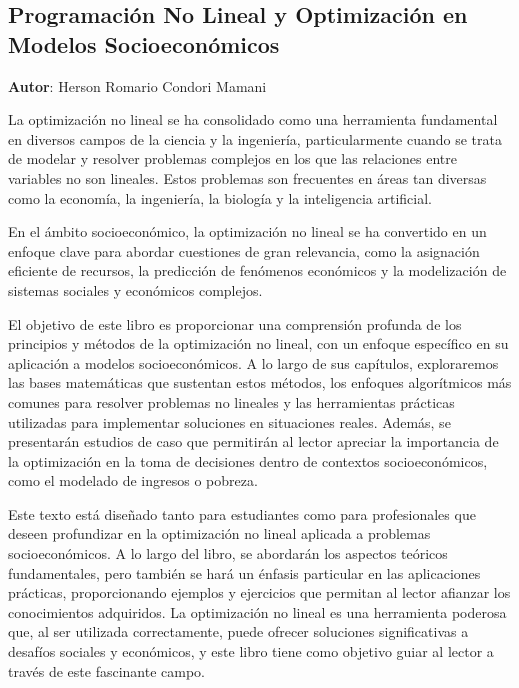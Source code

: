 
\begin{flushleft}
		
	\chapter{Programación No Lineal y Optimización en Modelos Socioeconómicos}
	\textbf{Autor}: \large{Herson Romario Condori Mamani}
	\label{chap:6}
	
	\vspace{1em}
	La optimización no lineal se ha consolidado como una herramienta fundamental en diversos campos de la ciencia y la ingeniería, particularmente cuando se trata de modelar y resolver problemas complejos en los que las relaciones entre variables no son lineales. Estos problemas son frecuentes en áreas tan diversas como la economía, la ingeniería, la biología y la inteligencia artificial.
	
	En el ámbito socioeconómico, la optimización no lineal se ha convertido en un enfoque clave para abordar cuestiones de gran relevancia, como la asignación eficiente de recursos, la predicción de fenómenos económicos y la modelización de sistemas sociales y económicos complejos.
	
	El objetivo de este libro es proporcionar una comprensión profunda de los principios y métodos de la optimización no lineal, con un enfoque específico en su aplicación a modelos socioeconómicos. A lo largo de sus capítulos, exploraremos las bases matemáticas que sustentan estos métodos, los enfoques algorítmicos más comunes para resolver problemas no lineales y las herramientas prácticas utilizadas para implementar soluciones en situaciones reales. Además, se presentarán estudios de caso que permitirán al lector apreciar la importancia de la optimización en la toma de decisiones dentro de contextos socioeconómicos, como el modelado de ingresos o pobreza.
	
	Este texto está diseñado tanto para estudiantes como para profesionales que deseen profundizar en la optimización no lineal aplicada a problemas socioeconómicos. A lo largo del libro, se abordarán los aspectos teóricos fundamentales, pero también se hará un énfasis particular en las aplicaciones prácticas, proporcionando ejemplos y ejercicios que permitan al lector afianzar los conocimientos adquiridos. La optimización no lineal es una herramienta poderosa que, al ser utilizada correctamente, puede ofrecer soluciones significativas a desafíos sociales y económicos, y este libro tiene como objetivo guiar al lector a través de este fascinante campo.
	

\end{flushleft}
